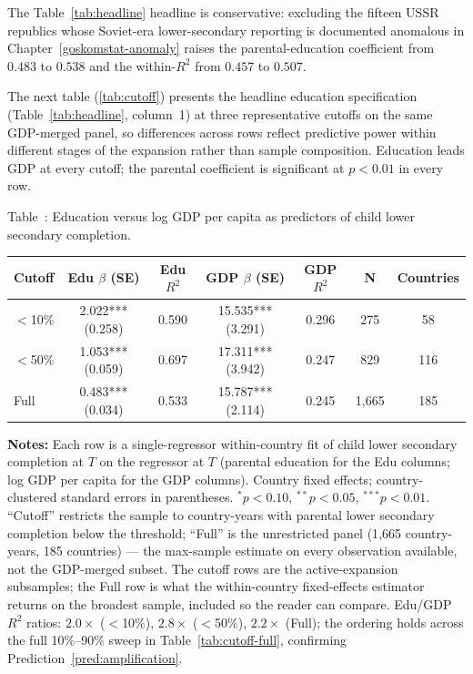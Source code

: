 \documentclass[12pt,letterpaper]{article}
\begin{document}
The Table~\ref{tab:headline} headline is conservative: excluding the fifteen
USSR republics whose Soviet-era lower-secondary reporting is
documented anomalous in Chapter~\ref{goskomstat-anomaly} raises the
parental-education coefficient from $0.483$ to $0.538$ and the
within-$R^2$ from $0.457$ to $0.507$.

The next table (\ref{tab:cutoff}) presents the headline education
specification (Table~\ref{tab:headline}, column~1) at three representative
cutoffs on the same GDP-merged panel, so differences across rows
reflect predictive power within different stages of the expansion
rather than sample composition. Education leads GDP at every cutoff;
the parental coefficient is significant at $p<0.01$ in every row.

\label{tab:cutoff}Table~\thetable: Education versus log GDP per capita as predictors of child lower secondary completion.

{\small\setlength{\tabcolsep}{4pt}
\begin{longtable}[]{@{}lcccccc@{}}
\toprule
Cutoff & Edu $\beta$ (SE) & Edu $R^2$ & GDP $\beta$ (SE) & GDP $R^2$ & N & Countries \\
\midrule
\endhead
$<$10\%  & 2.022*** (0.258) & 0.590 & 15.535*** (3.291) & 0.296 & 275  & 58  \\
$<$50\%  & 1.053*** (0.059) & 0.697 & 17.311*** (3.942) & 0.247 & 829  & 116 \\
Full     & 0.483*** (0.034) & 0.533 & 15.787*** (2.114) & 0.245 & 1{,}665 & 185 \\
\bottomrule
\end{longtable}}

\begin{minipage}{\dimexpr\textwidth-2em}
\scriptsize
\textbf{Notes:} Each row is a single-regressor within-country fit
of child lower secondary completion at $T$ on the regressor at $T$
(parental education for the Edu columns; log GDP per capita for the
GDP columns). Country fixed effects; country-clustered standard
errors in parentheses. $^{*}p<0.10$, $^{**}p<0.05$, $^{***}p<0.01$.
``Cutoff'' restricts the sample to country-years with parental lower
secondary completion below the threshold; ``Full'' is the unrestricted
panel (1{,}665 country-years, 185 countries) --- the max-sample
estimate on every observation available, not the GDP-merged subset.
The cutoff rows are the active-expansion subsamples; the Full row is
what the within-country fixed-effects estimator returns on the
broadest sample, included so the reader can compare. Edu/GDP $R^2$ ratios:
$2.0\times$ ($<$10\%), $2.8\times$ ($<$50\%), $2.2\times$ (Full); the
ordering holds across the full 10\%--90\% sweep in
Table~\ref{tab:cutoff-full}, confirming
Prediction~\ref{pred:amplification}.
\end{minipage}
\end{document}

